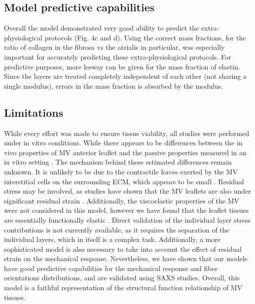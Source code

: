     
\subsection{Model predictive capabilities}

    Overall the model demonstrated very good ability to predict the extra-physiological protocols (Fig. 4c and d). Using the correct mass fractions, for the ratio of collagen in the fibrosa vs the atrialis in particular, was especially important for accurately predicting these extra-physiological protocols. For predictive purposes, more leeway can be given for the mass fraction of elastin. Since the layers are treated completely independent of each other (not sharing a single modulus), errors in the mass fraction is absorbed by the modulus.
    
    
    
    
\subsection{Limitations}

    While every effort was made to ensure tissue viability, all studies were performed under in vitro conditions. While there appears to be differences between the in vivo properties of MV anterior leaflet \cite{krishnamurthy_material_2008} and the passive properties measured in an in vitro setting \cite{grashow_planar_2006}\cite{may-newman_biaxial_1995}. The mechanism behind these estimated differences remain unknown. It is unlikely to be due to the contractile forces exerted by the MV interstitial cells on the surrounding ECM, which appears to be small \cite{buchanan_interlayer_2013}. Residual stress may be involved, as studies have shown that the MV leaflets are also under significant residual strain \cite{amini_vivo_2012}. Additionally, the viscoelastic properties of the MV were not considered in this model, however we have found that the leaflet tissues are essentially functionally elastic \cite{grashow_biaxial_2006}\cite{grashow_planar_2006}. Direct validation of the individual layer stress contributions is not currently available, as it requires the separation of the individual layers, which in itself is a complex task. Additionally, a more sophisticated model is also necessary to take into account the effect of residual strain on the mechanical response. Nevertheless, we have shown that our models have good predictive capabilities for the mechanical response and fiber orientations distributions, and are validated using SAXS studies. Overall, this model is a faithful representation of the structural function relationship of MV tissues.